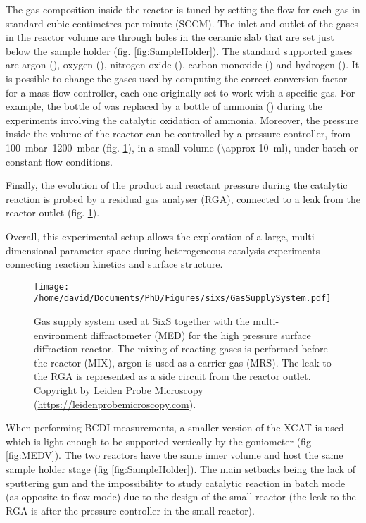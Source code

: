 The gas composition inside the reactor is tuned by setting the flow for each gas in standard cubic centimetres per minute (SCCM).
The inlet and outlet of the gases in the reactor volume are through holes in the ceramic slab that are set just below the sample holder (fig. \ref{fig:SampleHolder}).
The standard supported gases are argon (\argon), oxygen (\dioxygen), nitrogen oxide (\nitricoxide), carbon monoxide () and hydrogen ().
It is possible to change the gases used by computing the correct conversion factor for a mass flow controller, each one originally set to work with a specific gas.
For example, the bottle of  was replaced by a bottle of ammonia (\ammonia) during the experiments involving the catalytic oxidation of ammonia.
Moreover, the pressure inside the volume of the reactor can be controlled by a pressure controller, from \qtyrange{100}{1200}{\milli\bar} (fig. \ref{fig:GasSupplySystem}), in a small volume (\qty{\approx 10}{\ml}), under batch or constant flow conditions.

Finally, the evolution of the product and reactant pressure during the catalytic reaction is probed by a residual gas analyser (RGA), connected to a leak from the reactor outlet (fig. \ref{fig:GasSupplySystem}).

Overall, this experimental setup allows the exploration of a large, multi-dimensional parameter space during heterogeneous catalysis experiments connecting reaction kinetics and surface structure.

\begin{figure}[!htb]
    \centering
    \texttt{[image: /home/david/Documents/PhD/Figures/sixs/GasSupplySystem.pdf]}
    \caption{
    	Gas supply system used at SixS together with the multi-environment diffractometer (MED) for the high pressure surface diffraction reactor.
    	The mixing of reacting gases is performed before the reactor (MIX), argon is used as a carrier gas (MRS).
    	The leak to the RGA is represented as a side circuit from the reactor outlet.
    	Copyright by Leiden Probe Microscopy (\url{https://leidenprobemicroscopy.com}).
    }
    \label{fig:GasSupplySystem}
\end{figure}

When performing BCDI measurements, a smaller version of the XCAT is used which is light enough to be supported vertically by the goniometer (fig \ref{fig:MEDV}).
The two reactors have the same inner volume and host the same sample holder stage (fig \ref{fig:SampleHolder}).
The main setbacks being the lack of sputtering gun and the impossibility to study catalytic reaction in batch mode (as opposite to flow mode) due to the design of the small reactor (the leak to the RGA is after the pressure controller in the small reactor).

